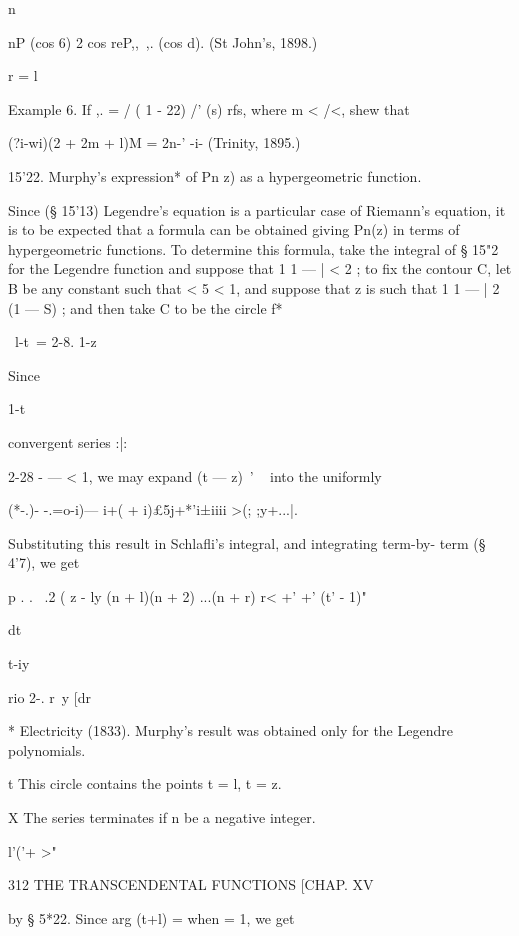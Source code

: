 {{n

nP (cos 6) 2 cos reP,,\ ,. (cos d). (St John's, 1898.)

r = l

Example 6. If ,. = / ( 1 - 22) /' (s) rfs, where m < /<, shew that

(?i-wi)(2 + 2m + l)M = 2n-' -i- (Trinity, 1895.)

15'22. Murphy's expression* of Pn z) as a hypergeometric function.

Since (§ 15'13) Legendre's equation is a particular case of Riemann's
equation, it is to be expected that a formula can be obtained giving
Pn(z) in terms of hypergeometric functions. To determine this formula,
take the integral of § 15"2 for the Legendre function and suppose that
1 1 — | < 2 ; to fix the contour C, let B be any constant such that <
5 < 1, and suppose that z is such that 1 1 — | 2 (1 — S) ; and then
take C to be the circle f*

\ l-t\ = 2-8. 1-z



Since



1-t

convergent series :|:



2-28 - — < 1, we may expand (t — z)~' ~ into the uniformly



(*-.)- -.=o-i)— i+( + i)£5j+*'i±iiii >(; ;y+...|.

Substituting this result in Schlafli's integral, and integrating
term-by- term (§ 4'7), we get

p . . \ .2 ( z - ly (n + l)(n + 2) ...(n + r) r< +' +' (t' - 1)"



dt



 t-iy

rio 2-. r\ y [dr

* Electricity (1833). Murphy's result was obtained only for the
Legendre polynomials.

t This circle contains the points t = l, t = z.

X The series terminates if n be a negative integer.



l'('+ >"



312 THE TRANSCENDENTAL FUNCTIONS [CHAP. XV

by § 5*22. Since arg (t+l) = when = 1, we get

}}
